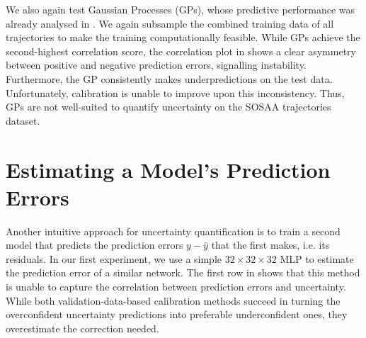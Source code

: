 \noindent We also again test Gaussian Processes (GPs), whose predictive performance was already analysed in . We again subsample the combined training data of all trajectories to make the training computationally feasible. While GPs achieve the second-highest correlation score, the correlation plot in  shows a clear asymmetry between positive and negative prediction errors, signalling instability. Furthermore, the GP consistently makes underpredictions on the test data. Unfortunately, calibration is unable to improve upon this inconsistency. Thus, GPs are not well-suited to quantify uncertainty on the SOSAA trajectories dataset.

\section{Estimating a Model's Prediction Errors} \label{txt:uncertainty-predict-error}

Another intuitive approach for uncertainty quantification is to train a second model that predicts the prediction errors $y - \hat{y}$ that the first makes, i.e. its residuals. In our first experiment, we use a simple $32 \times 32 \times 32$ MLP to estimate the prediction error of a similar network. The first row in  shows that this method is unable to capture the correlation between prediction errors and uncertainty. While both validation-data-based calibration methods succeed in turning the overconfident uncertainty predictions into preferable underconfident ones, they overestimate the correction needed.

